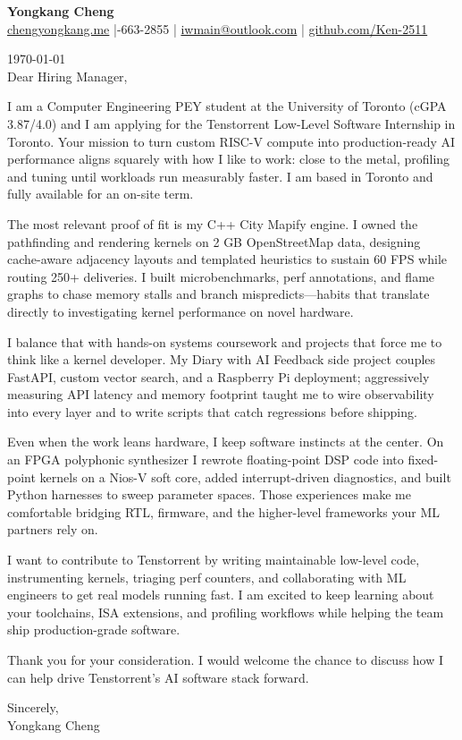 \documentclass[11pt]{article}
\begin{document}
{\Large \textbf{Yongkang Cheng}}\\[2pt]
\href{https://chengyongkang.me/}{chengyongkang.me} \;|-663-2855 \;|\; \href{mailto:iwmain@outlook.com}{iwmain@outlook.com} \;|\; \href{https://github.com/Ken-2511}{github.com/Ken-2511}

\today\\[0.8em]

Dear Hiring Manager,

I am a Computer Engineering PEY student at the University of Toronto (cGPA 3.87/4.0) and I am applying for the Tenstorrent Low-Level Software Internship in Toronto. Your mission to turn custom RISC-V compute into production-ready AI performance aligns squarely with how I like to work: close to the metal, profiling and tuning until workloads run measurably faster. I am based in Toronto and fully available for an on-site term.

The most relevant proof of fit is my C++ City Mapify engine. I owned the pathfinding and rendering kernels on 2 GB OpenStreetMap data, designing cache-aware adjacency layouts and templated heuristics to sustain 60 FPS while routing 250+ deliveries. I built microbenchmarks, perf annotations, and flame graphs to chase memory stalls and branch mispredicts—habits that translate directly to investigating kernel performance on novel hardware.

I balance that with hands-on systems coursework and projects that force me to think like a kernel developer. My Diary with AI Feedback side project couples FastAPI, custom vector search, and a Raspberry Pi deployment; aggressively measuring API latency and memory footprint taught me to wire observability into every layer and to write scripts that catch regressions before shipping.

Even when the work leans hardware, I keep software instincts at the center. On an FPGA polyphonic synthesizer I rewrote floating-point DSP code into fixed-point kernels on a Nios-V soft core, added interrupt-driven diagnostics, and built Python harnesses to sweep parameter spaces. Those experiences make me comfortable bridging RTL, firmware, and the higher-level frameworks your ML partners rely on.

I want to contribute to Tenstorrent by writing maintainable low-level code, instrumenting kernels, triaging perf counters, and collaborating with ML engineers to get real models running fast. I am excited to keep learning about your toolchains, ISA extensions, and profiling workflows while helping the team ship production-grade software.

Thank you for your consideration. I would welcome the chance to discuss how I can help drive Tenstorrent’s AI software stack forward.

\vspace{1em}
Sincerely,\\[1.2em]
Yongkang Cheng
\end{document}
